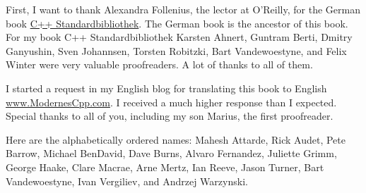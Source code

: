 First, I want to thank Alexandra Follenius, the lector at O’Reilly, for the German book \href{http://shop.oreilly.com/product/9783955619688.do}{C++ Standardbibliothek}. The German book is the ancestor of this book. For my book C++ Standardbibliothek Karsten Ahnert, Guntram Berti, Dmitry Ganyushin, Sven Johannsen, Torsten Robitzki, Bart Vandewoestyne, and Felix Winter were very valuable proofreaders. A lot of thanks to all of them.

I started a request in my English blog for translating this book to English \href{http://www.modernescpp.com/index.php/do-you-wan-t-to-proofread-a-book}{www.ModernesCpp.com}. I received a much higher response than I expected. Special thanks to all of you, including my son Marius, the first proofreader.

Here are the alphabetically ordered names: Mahesh Attarde, Rick Audet, Pete Barrow, Michael BenDavid, Dave Burns, Alvaro Fernandez, Juliette Grimm, George Haake, Clare Macrae, Arne Mertz, Ian Reeve, Jason Turner, Bart Vandewoestyne, Ivan Vergiliev, and Andrzej Warzynski.